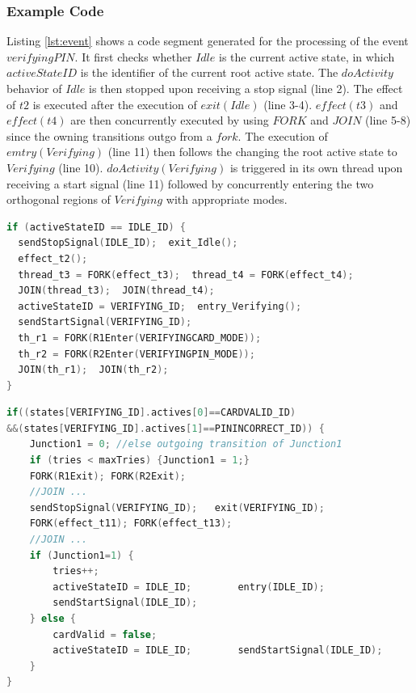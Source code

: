 \subsubsection{Example Code} Listing \ref{lst:event} shows a code segment generated for the processing of the event $verifyingPIN$. It first checks whether $Idle$ is the current active state, in which $activeStateID$ is the identifier of the current root active state. The $doActivity$ behavior of $Idle$ is then stopped upon receiving a stop signal (line 2). The effect of $t2$ is executed after the execution of $exit(Idle)$ (line 3-4). $effect(t3)$ and $effect(t4)$ are then concurrently executed by using $FORK$ and $JOIN$ (line 5-8) since the owning transitions outgo from a $fork$. The execution of $emtry(Verifying)$ (line 11) then follows the changing the root active state to $Verifying$ (line 10). $doActivity(Verifying)$ is triggered in its own thread upon receiving a start signal (line 11) followed by concurrently entering the two orthogonal regions of $Verifying$ with appropriate modes.

 
\begin{lstlisting}[caption=Example code generated for event $verifyingPIN$, label=lst:event, language=C++]
if (activeStateID == IDLE_ID) {
  sendStopSignal(IDLE_ID);  exit_Idle();
  effect_t2();
  thread_t3 = FORK(effect_t3);  thread_t4 = FORK(effect_t4);
  JOIN(thread_t3);  JOIN(thread_t4);
  activeStateID = VERIFYING_ID;  entry_Verifying();
  sendStartSignal(VERIFYING_ID);
  th_r1 = FORK(R1Enter(VERIFYINGCARD_MODE));
  th_r2 = FORK(R2Enter(VERIFYINGPIN_MODE));
  JOIN(th_r1);  JOIN(th_r2);
}
\end{lstlisting}


\begin{lstlisting}[caption=Example code generated for $Join1$ and $Junction1$, label=lst:event1, language=C++]
if((states[VERIFYING_ID].actives[0]==CARDVALID_ID)
&&(states[VERIFYING_ID].actives[1]==PININCORRECT_ID)) {
	Junction1 = 0; //else outgoing transition of Junction1
	if (tries < maxTries) {Junction1 = 1;}
	FORK(R1Exit); FORK(R2Exit);
	//JOIN ...
	sendStopSignal(VERIFYING_ID);	exit(VERIFYING_ID);
	FORK(effect_t11); FORK(effect_t13);
	//JOIN ...
	if (Junction1=1) {
		tries++;
		activeStateID = IDLE_ID;		entry(IDLE_ID);
		sendStartSignal(IDLE_ID);
	} else {
		cardValid = false;
		activeStateID = IDLE_ID;		sendStartSignal(IDLE_ID);
	}
}
\end{lstlisting}



 


 

